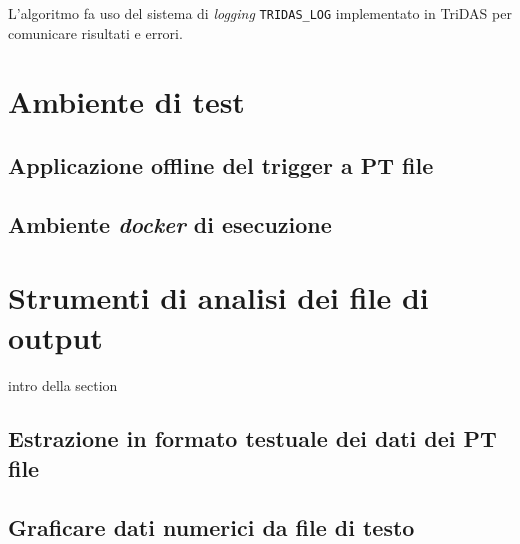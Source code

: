 \documentclass[../main.tex]{subfiles}
\begin{document}
L'algoritmo fa uso del sistema di \emph{logging} \texttt{TRIDAS\_LOG} implementato in TriDAS per comunicare risultati e errori. 

\section{Ambiente di test}
\subsection{Applicazione offline del trigger a PT file}
\subsection{Ambiente \emph{docker} di esecuzione}
\section{Strumenti di analisi dei file di output}
intro della section
\subsection{Estrazione in formato testuale dei dati dei PT file}
\subsection{Graficare dati numerici da file di testo}
\end{document}
